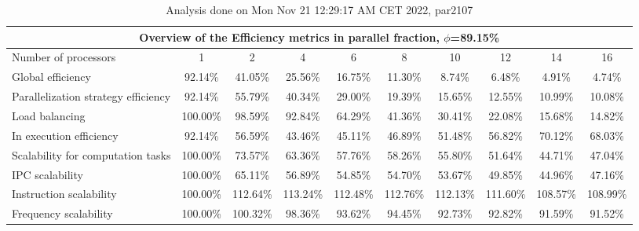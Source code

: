 \begin{table}[h]
\begin{center}
\begin{tabular}{|l|c|c|c|c|c|c|c|c|c|}
\hline
\multicolumn{10}{|c|}{Overview of the Efficiency metrics in parallel fraction, $\phi$=89.15\%} \\
\hline
\hline
Number of processors & 1 & 2 & 4 & 6 & 8 & 10 & 12 & 14 & 16 \\
\hline
\hline
Global efficiency                      &     92.14\% &     41.05\% &     25.56\% &     16.75\% &     11.30\% &      8.74\% &      6.48\% &      4.91\% &      4.74\% \\
\hline
\hline
Parallelization strategy efficiency &     92.14\% &     55.79\% &     40.34\% &     29.00\% &     19.39\% &     15.65\% &     12.55\% &     10.99\% &     10.08\% \\
\hline
Load balancing                   &    100.00\% &     98.59\% &     92.84\% &     64.29\% &     41.36\% &     30.41\% &     22.08\% &     15.68\% &     14.82\% \\
In execution efficiency          &     92.14\% &     56.59\% &     43.46\% &     45.11\% &     46.89\% &     51.48\% &     56.82\% &     70.12\% &     68.03\% \\
\hline
\hline
Scalability for computation tasks   &    100.00\% &     73.57\% &     63.36\% &     57.76\% &     58.26\% &     55.80\% &     51.64\% &     44.71\% &     47.04\% \\
\hline
IPC scalability                  &    100.00\% &     65.11\% &     56.89\% &     54.85\% &     54.70\% &     53.67\% &     49.85\% &     44.96\% &     47.16\% \\
Instruction scalability          &    100.00\% &    112.64\% &    113.24\% &    112.48\% &    112.76\% &    112.13\% &    111.60\% &    108.57\% &    108.99\% \\
Frequency scalability            &    100.00\% &    100.32\% &     98.36\% &     93.62\% &     94.45\% &     92.73\% &     92.82\% &     91.59\% &     91.52\% \\
\hline
\end{tabular}
\end{center}
\caption{ Analysis done on Mon Nov 21 12:29:17 AM CET 2022, par2107}
\end{table}
